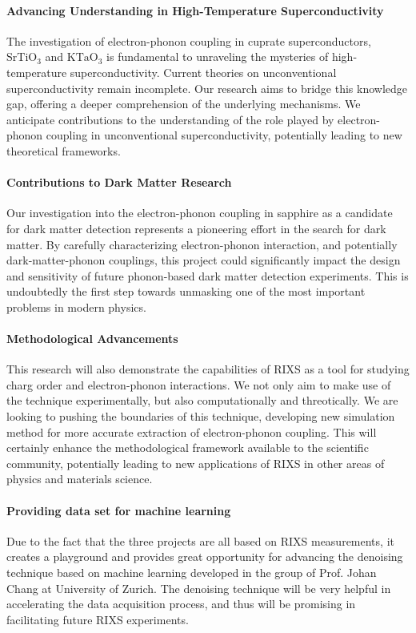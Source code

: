 \documentclass[11pt]{article}
\begin{document}
\paragraph{Advancing Understanding in High-Temperature Superconductivity}
The investigation of electron-phonon coupling in cuprate superconductors, $\mathrm{SrTiO_{3}}$ and $\mathrm{KTaO_{3}}$ is fundamental to unraveling the mysteries of high-temperature superconductivity. Current theories on unconventional superconductivity remain incomplete. Our research aims to bridge this knowledge gap, offering a deeper comprehension of the underlying mechanisms. We anticipate contributions to the understanding of the role played by electron-phonon coupling in unconventional superconductivity, potentially leading to new theoretical frameworks. 

\paragraph{Contributions to Dark Matter Research}
Our investigation into the electron-phonon coupling in sapphire as a candidate for dark matter detection represents a pioneering effort in the search for dark matter. By carefully characterizing electron-phonon interaction, and potentially dark-matter-phonon couplings, this project could significantly impact the design and sensitivity of future phonon-based dark matter detection experiments. This is undoubtedly the first step towards unmasking one of the most important problems in modern physics.

\paragraph{Methodological Advancements}
This research will also demonstrate the capabilities of RIXS as a tool for studying charg order and electron-phonon interactions. We not only aim to make use of the technique experimentally, but also computationally and threotically. We are looking to pushing the boundaries of this technique, developing new simulation method for more accurate extraction of electron-phonon coupling. This will certainly enhance the methodological framework available to the scientific community, potentially leading to new applications of RIXS in other areas of physics and materials science.

\paragraph{Providing data set for machine learning}
Due to the fact that the three projects are all based on RIXS measurements, it creates a playground and provides great opportunity for advancing the denoising technique based on machine learning developed in the group of Prof. Johan Chang at University of Zurich. The denoising technique will be very helpful in accelerating the data acquisition process, and thus will be promising in facilitating future RIXS experiments.





\end{document}
